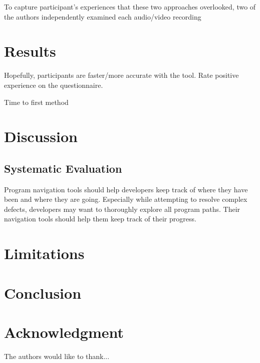 \documentclass[conference]{IEEEtran}
\begin{document}
To capture participant's experiences that these two approaches overlooked, two of the authors independently examined each audio/video recording 

\section{Results}
Hopefully, participants are faster/more accurate with the tool. Rate positive experience on the questionnaire.

Time to first method

\section{Discussion}


\subsection{Systematic Evaluation}
Program navigation tools should help developers keep track of where they have been and where they are going. Especially while attempting to resolve complex defects, developers may want to thoroughly explore all program paths. Their navigation tools should help them keep track of their progress.


\section{Limitations}

\section{Conclusion}

\section*{Acknowledgment}

The authors would like to thank...













\end{document}
